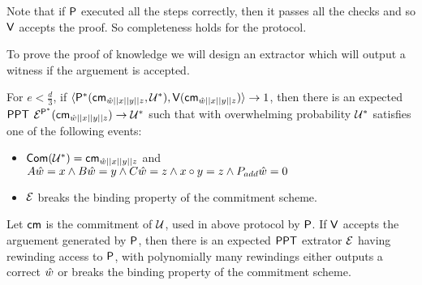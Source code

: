 Note that if $\mathsf{P}$ executed all the steps correctly, then it passes all the checks and so $\mathsf{V}$ accepts the proof. So completeness holds for the protocol.

To prove the proof of knowledge we will design an extractor which will output a witness if the arguement is accepted.

\begin{theorem}
	For $e < \frac{d}{3}$, if $\langle \mathsf{P}^*(\mathsf{cm}_{\hat{w}||x||y||z}, \mathcal{U}^*),\mathsf{V}(\mathsf{cm}_{\hat{w}||x||y||z})\rangle \rightarrow 1$, then there is an expected $\mathsf{PPT}$ $\mathcal{E}^{\mathsf{P}^*}(\mathsf{cm}_{\hat{w}||x||y||z}) \rightarrow \mathcal{U}^*$ such that with overwhelming probability $\mathcal{U}^*$ satisfies one of the following events:
	\begin{itemize}
		\item $\mathsf{Com}(\mathcal{U}^*)=\mathsf{cm}_{\hat{w}||x||y||z}$ and $A\hat{w} = x \wedge B \hat{w} = y \wedge C \hat{w} = z \wedge x\circ y =z \wedge P_{add} \hat{w} = 0$
		\item $\mathcal{E}$ breaks the binding property of the commitment scheme.
		
	\end{itemize}
	Let $\mathsf{cm}$ is the commitment of $\mathcal{U}$, used in above protocol by $\mathsf{P}$. If $\mathsf{V}$ accepts the arguement generated by $\mathsf{P}$, then there is an expected $\mathsf{PPT}$ extrator $\mathcal{E}$ having rewinding access to $\mathsf{P}$, with polynomially many rewindings either outputs a correct $\hat{w}$ or breaks the binding property of the commitment scheme.
\end{theorem}
